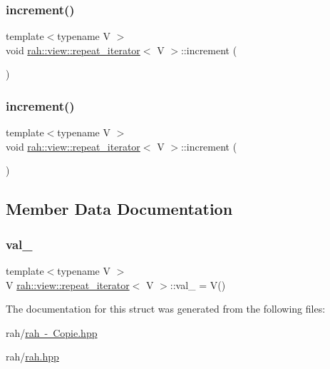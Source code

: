 \subsubsection{\texorpdfstring{increment()}{increment()}\hspace{0.1cm}{\footnotesize\ttfamily [1/2]}}
{\footnotesize\ttfamily template$<$typename V $>$ \\
void \mbox{\hyperlink{structrah_1_1view_1_1repeat__iterator}{rah\+::view\+::repeat\+\_\+iterator}}$<$ V $>$\+::increment (\begin{DoxyParamCaption}{ }\end{DoxyParamCaption})\hspace{0.3cm}{\ttfamily [inline]}}

\mbox{\label{structrah_1_1view_1_1repeat__iterator_a5556f69de4c759f4fec42c12d70ea869}} 
\subsubsection{\texorpdfstring{increment()}{increment()}\hspace{0.1cm}{\footnotesize\ttfamily [2/2]}}
{\footnotesize\ttfamily template$<$typename V $>$ \\
void \mbox{\hyperlink{structrah_1_1view_1_1repeat__iterator}{rah\+::view\+::repeat\+\_\+iterator}}$<$ V $>$\+::increment (\begin{DoxyParamCaption}{ }\end{DoxyParamCaption})\hspace{0.3cm}{\ttfamily [inline]}}



\subsection{Member Data Documentation}
\mbox{\label{structrah_1_1view_1_1repeat__iterator_a6286ca38cb848630cb870dc6ab42eb79}} 
\subsubsection{\texorpdfstring{val\_}{val\_}}
{\footnotesize\ttfamily template$<$typename V $>$ \\
V \mbox{\hyperlink{structrah_1_1view_1_1repeat__iterator}{rah\+::view\+::repeat\+\_\+iterator}}$<$ V $>$\+::val\+\_\+ = V()}



The documentation for this struct was generated from the following files\+:\begin{DoxyCompactItemize}
\item 
rah/\mbox{\hyperlink{rah_01-_01_copie_8hpp}{rah -\/ Copie.\+hpp}}\item 
rah/\mbox{\hyperlink{rah_8hpp}{rah.\+hpp}}\end{DoxyCompactItemize}
